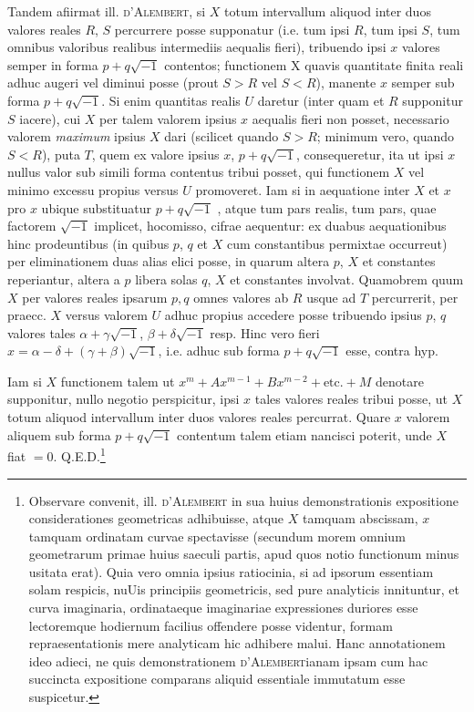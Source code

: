 \documentclass[twoside,12pt, showframe]{memoir}
\begin{document}
Tandem afiirmat ill. \textsc{d'Alembert}, si \(X\) totum intervallum aliquod inter duos valores reales \(R\), \(S\) percurrere posse supponatur (i.e. tum ipsi \(R\), tum ipsi \(S\), tum omnibus valoribus realibus intermediis aequalis fieri), tribuendo ipsi \(x\) valores semper in forma \(p+q\surd{-1}\)  contentos; functionem X quavis quantitate finita reali adhuc augeri vel diminui posse (prout \(S>R\) vel \(S<R\)), manente \(x\) semper sub forma \(p+q\surd{-1}\). Si enim quantitas realis \(U\) daretur (inter quam et \(R\) supponitur \(S\) iacere), cui \(X\) per talem valorem ipsius \(x\) aequalis fieri non posset, necessario valorem \textit{maximum} ipsius \(X\) dari (scilicet quando \(S>R\); minimum vero, quando \(S<R\)), puta \(T\), quem ex valore ipsius \(x\), \(p+q\surd{-1}\), consequeretur, ita ut ipsi \(x\) nullus valor sub simili forma contentus tribui posset, qui functionem \(X\) vel minimo excessu propius versus \(U\) promoveret. Iam si in aequatione inter \(X\) et \(x\) pro \(x\) ubique substituatur \(p+q\surd{-1}\) , atque tum pars realis, tum pars, quae factorem \(\surd{-1}\) implicet, hocomisso, cifrae aequentur: ex duabus aequationibus hinc prodeuntibus (in quibus \(p\), \(q\) et \(X\) cum constantibus permixtae occurreut) per eliminationem duas alias elici posse, in quarum altera \(p\), \(X\) et constantes reperiantur, altera a \(p\) libera solas \(q\), \(X\) et constantes involvat. Quamobrem quum \(X\) per valores reales ipsarum \(p, q\) omnes valores ab \(R\) usque ad \(T\) percurrerit, per praecc. \(X\) versus valorem \(U\) adhuc propius accedere posse tribuendo ipsius \(p\), \(q\) valores tales \(\alpha + \gamma \surd{-1}\), \(\beta + \delta\surd{-1}\) resp. Hinc vero fieri \(x = \alpha - \delta + (\gamma + \beta)\surd{-1}\), i.e. adhuc sub forma \(p+q\surd{-1}\) esse, contra hyp.

Iam si \(X\) functionem talem ut \(x^m + A x^{m-1} + B x^{m-2} + \text{etc{.}} + M\) denotare supponitur, nullo negotio perspicitur, ipsi \(x\) tales valores reales tribui posse, ut \(X\) totum aliquod intervallum inter duos valores reales percurrat. Quare \(x\) valorem aliquem sub forma \(p+q\surd{-1}\) contentum talem etiam nancisci poterit, unde \(X\) fiat \(=0\).   Q.E.D.\footnote{Observare convenit, ill. \textsc{d'Alembert} in sua huius demonstrationis expositione considerationes geometricas adhibuisse, atque \(X\) tamquam abscissam, \(x\) tamquam ordinatam curvae spectavisse (secundum morem omnium geometrarum primae huius saeculi partis, apud quos notio functionum minus usitata erat). Quia vero omnia ipsius ratiocinia, si ad ipsorum essentiam solam respicis, nuUis principiis geometricis, sed pure analyticis innituntur, et curva imaginaria, ordinataeque imaginariae expressiones duriores esse lectoremque hodiernum facilius offendere posse videntur, formam repraesentationis mere analyticam hic adhibere malui. Hanc annotationem ideo adieci, ne quis demonstrationem \textsc{d'Alembert}ianam ipsam cum hac succincta expositione comparans aliquid essentiale immutatum esse suspicetur.}
\end{document}
